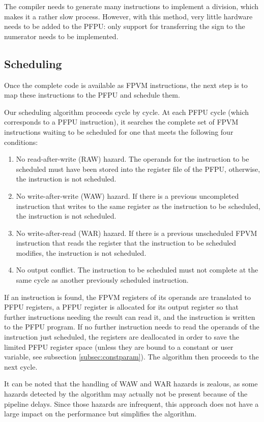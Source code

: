 \documentclass[a4paper,11pt]{kthesis}
\begin{document}
The compiler needs to generate many instructions to implement a division, which makes it a rather slow process. However, with this method, very little hardware needs to be added to the PFPU: only support for transferring the sign to the numerator needs to be implemented.

\subsection{Scheduling}
\label{subsec:vliwsched}
Once the complete code is available as FPVM instructions, the next step is to map these instructions to the PFPU and schedule them.

Our scheduling algorithm proceeds cycle by cycle. At each PFPU cycle (which corresponds to a PFPU instruction), it searches the complete set of FPVM instructions waiting to be scheduled for one that meets the following four conditions:
\begin{enumerate}
\item No read-after-write (RAW) hazard. The operands for the instruction to be scheduled must have been stored into the register file of the PFPU, otherwise, the instruction is not scheduled.
\item No write-after-write (WAW) hazard. If there is a previous uncompleted instruction that writes to the same register as the instruction to be scheduled, the instruction is not scheduled.
\item No write-after-read (WAR) hazard. If there is a previous unscheduled FPVM instruction that reads the register that the instruction to be scheduled modifies, the instruction is not scheduled.
\item No output conflict. The instruction to be scheduled must not complete at the same cycle as another previously scheduled instruction.
\end{enumerate}
If an instruction is found, the FPVM registers of its operands are translated to PFPU registers, a PFPU register is allocated for its output register so that further instructions needing the result can read it, and the instruction is written to the PFPU program. If no further instruction needs to read the operands of the instruction just scheduled, the registers are deallocated in order to save the limited PFPU register space (unless they are bound to a constant or user variable, see subsection \ref{subsec:constparam}). The algorithm then proceeds to the next cycle.

It can be noted that the handling of WAW and WAR hazards is zealous, as some hazards detected by the algorithm may actually not be present because of the pipeline delays. Since those hazards are infrequent, this approach does not have a large impact on the performance but simplifies the algorithm.
\end{document}
